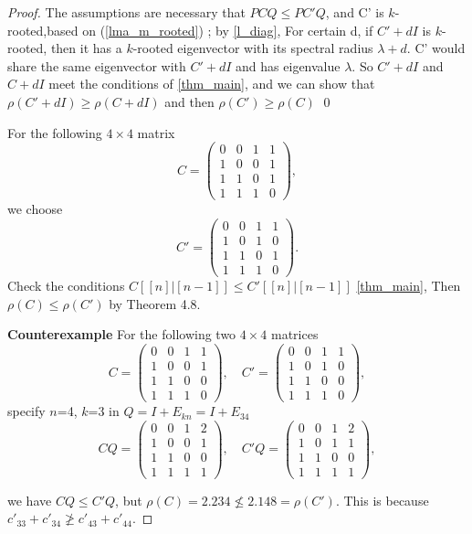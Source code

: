 \documentclass[12pt]{report}%
\theoremstyle{plain}
\theoremstyle{definition}
\begin{document}
\begin{proof}

The assumptions are necessary that $PCQ \leq PC'Q$, and C' is $k$-rooted,based on (\ref{lma_m_rooted}) ; by \ref{l_diag}, For certain d, if $C'+dI$ is $k$-rooted, then it has a $k$-rooted eigenvector with its spectral radius $\lambda + d$. C' would share the same eigenvector with $C'+dI$ and has eigenvalue $\lambda$. So $C'+dI$ and $C+dI$ meet the conditions of \ref{thm_main}, and we can show that $\rho(C' + dI) \geq \rho(C +dI)$ and then $\rho(C') \geq \rho(C)$  \qed



For the following $4\times 4$ matrix
$$C=\begin{pmatrix}
0 & 0 & 1 & 1\\
1 & 0 & 0 & 1\\
1 & 1 & 0 & 1\\
1 & 1 & 1 & 0
\end{pmatrix},$$
we choose
$$C'=\begin{pmatrix}
0 & 0 & 1 & 1\\
1 & 0 & 1 &  0\\
1 & 1 & 0 & 1\\
1 & 1 & 1 & 0
\end{pmatrix}.$$
Check the conditions $C[[n]|[n-1]]  \leq C'[[n]|[n-1]] $ \ref{thm_main},   
Then
$\rho(C)\leq \rho(C')$ by Theorem 4.8.




{\bf Counterexample}
For the following two $4\times 4$ matrices
$$C=\begin{pmatrix}
0 & 0 & 1 & 1\\
1 & 0 & 0 & 1\\
1 & 1 & 0 & 0\\
1 & 1 & 1 & 0
\end{pmatrix},\quad C'=\begin{pmatrix}
0 & 0 & 1 & 1\\
1 & 0 & 1 &  0\\
1 & 1 & 0 & 0\\
1 & 1 & 1 & 0
\end{pmatrix},$$
specify $n$=4, $k$=3 in $Q = I +E_{kn} = I + E_{34}$  
$$CQ=\begin{pmatrix}
0 & 0 & 1 & 2\\
1 & 0 & 0 & 1\\
1 & 1 & 0 & 0\\
1 & 1 & 1 & 1
\end{pmatrix},\quad C'Q=\begin{pmatrix}
0 & 0 & 1 & 2\\
1 & 0 & 1 & 1\\
1 & 1 & 0 & 0\\
1 & 1 & 1 & 1
\end{pmatrix},$$

we have $CQ\leq C'Q$, but
$\rho(C)=2.234\not\leq 2.148= \rho(C')$.
This is because $c'_{33}+c'_{34}\not\geq c'_{43}+c'_{44}$.

\end{proof}
\end{document}
